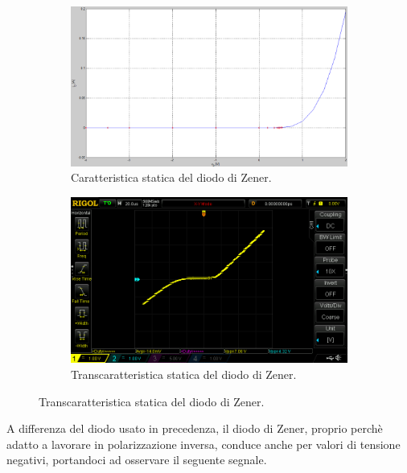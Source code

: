 \documentclass[a4paper]{article}
\begin{document}
				\begin{figure}[h!]
					\centering
					\begin{subfigure}{0.5\textwidth}
						\centering
						\includegraphics[scale=0.2]{caratteristicheStaticheDiodoDiZenerCaratteristica}
						\caption{Caratteristica statica del diodo di Zener.}
					\end{subfigure}
					\begin{subfigure}{0.3\textwidth}
						\centering
						\includegraphics[scale=0.2]{caratteristicheStaticheDiodoDiZenerTranscaratteristica}
						\caption{Transcaratteristica statica del diodo di Zener.}
					\end{subfigure}
					\label{fig:caratteristicheStaticheDiodoDiZener}
				\end{figure}
				\newline
				A differenza del diodo usato in precedenza, il diodo di Zener, proprio perchè adatto a lavorare in polarizzazione inversa, conduce anche per valori di tensione negativi, portandoci ad osservare il seguente segnale.		
\end{document}
